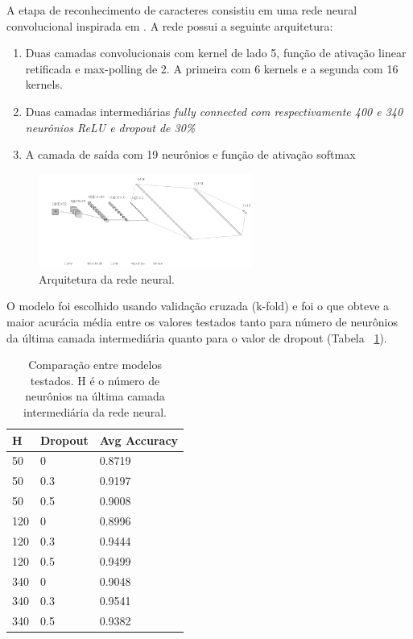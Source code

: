 \documentclass[11pt]{article}
\begin{document}
A etapa de reconhecimento de caracteres consistiu em uma rede neural convolucional inspirada em \cite{kopp2017}. A rede possui a seguinte arquitetura:

\begin{enumerate}
\item
    Duas camadas convolucionais com kernel de lado 5, função de ativação linear retificada e max-polling de 2. A primeira com 6 kernels e a segunda com 16 kernels.
\item
    Duas camadas intermediárias \em fully connected \em com respectivamente 400 e 340 neurônios ReLU e dropout de 30\%
\item
    A camada de saída com 19 neurônios e função de ativação softmax
\end{enumerate}

  \begin{figure}[H]
        {\centering
        \includegraphics[width=70mm]{images/nn.png}
        \caption{Arquitetura da rede neural.}
        \label{fig:nn}\par}
  \end{figure}

O modelo foi escolhido usando validação cruzada (k-fold) e foi o que obteve a maior acurácia média entre os valores testados tanto para número de neurônios da última camada intermediária quanto para o valor de dropout (Tabela ~\ref{tab:ex}).

\begin{table}[H]
    {\centering
\begin{tabular}{@{}lll@{}}
\toprule
H   & Dropout & Avg Accuracy \\ \midrule
50  & 0       & 0.8719       \\
50  & 0.3     & 0.9197       \\
50  & 0.5     & 0.9008       \\
120 & 0       & 0.8996       \\
120 & 0.3     & 0.9444       \\
120 & 0.5     & 0.9499       \\
340 & 0       & 0.9048       \\
340 & 0.3     & 0.9541       \\
340 & 0.5     & 0.9382       \\ \bottomrule
\end{tabular}
\caption{Comparação entre modelos testados. H é o número de neurônios na última camada intermediária da rede neural.}
\label{tab:ex}
    \par}
\end{table}
\end{document}
